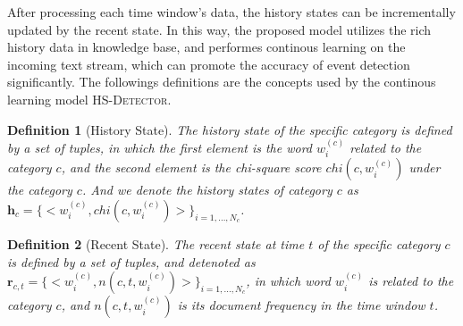 \documentclass{article}
\newtheorem{rmk}{Definition}%
\begin{document}
After processing each time window's data, the history states can be incrementally updated by the recent state. 
In this way, the proposed model utilizes the rich history data in knowledge base, and performes continous learning on the incoming text stream, which can promote the accuracy of event detection significantly. 
The followings definitions are the concepts used by the continous learning model \textsc{HS-Detector}. 


\begin{rmk}[History State] 
The history state of the specific category is defined by a set of tuples, in which the first element is the word \(w^{(c)}_i\) related to the category \(c\), and the second element is the chi-square score \(chi(c,w^{(c)}_{i})\) under the category \(c\). 
And we denote the history states of category \(c\) as \(\bm{h}_c=\{<w^{(c)}_i,chi(c,w^{(c)}_{i})>\}_{i=1,...,N_c}\).
\end{rmk}

\begin{rmk}[Recent State] 
The recent state at time \(t\) of the specific category \(c\) is defined by a set of tuples, and detenoted as \(\bm{r}_{c,t}=\{<w^{(c)}_i,n(c,t,w^{(c)}_{i})>\}_{i=1,...,N_c}\), in which word \(w^{(c)}_{i}\) is related to the category \(c\), and \(n(c,t,w^{(c)}_{i})\) is its document frequency in the time window \(t\).
\end{rmk}
\end{document}
